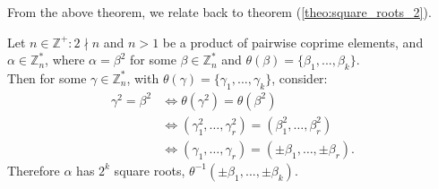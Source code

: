 \newpage
\noindent
From the above theorem, we relate back to theorem (\ref{theo:square_roots_2}).
\begin{theo}

    Let $n\in\mathbb{Z}^+:2\nmid n$ and $n>1$ be a product of pairwise coprime elements, and $\alpha\in\mathbb{Z}_n^*$, where $\alpha = \beta^2$ for some $\beta\in\mathbb{Z}_n^*$ and $\theta(\beta)=\{\beta_1,...,\beta_k\}$.\\
    
    \noindent
    Then for some $\gamma\in\mathbb{Z}_n^*$, with $\theta(\gamma)=\{\gamma_1,...,\gamma_k\}$, consider:
    \begin{align*}
        \gamma^2 = \beta^2 &\iff \theta(\gamma^2) = \theta(\beta^2) \\
        &\iff (\gamma_1^2, \dots, \gamma_r^2) = (\beta_1^2, \dots, \beta_r^2) \\
        &\iff (\gamma_1, \dots, \gamma_r) = (\pm \beta_1, \dots, \pm \beta_r).
        \end{align*}
    \noindent
    Therefore $\alpha$ has $2^k$ square roots, $\theta^{-1}(\pm\beta_1,...,\pm\beta_k)$.

\end{theo}


    